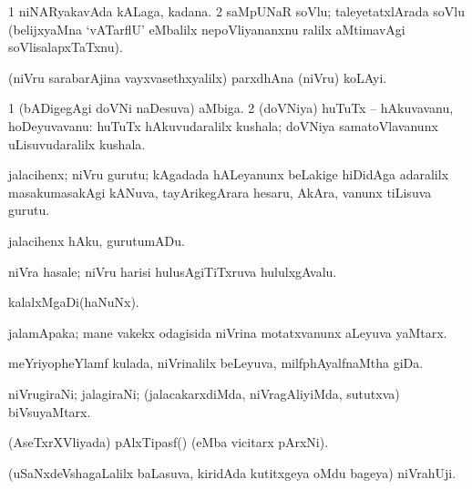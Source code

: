 \bentry
{} 
\gl{\nA}
\expl{}
\bmng
\bnum
\num{1} niNARyakavAda kALaga, kadana. 
\num{2} saMpUNaR soVlu; taleyetatxlArada soVlu (belijxyaMna `vATarflU' eMbalilx nepoVliyananxnu ralilx aMtimavAgi soVlisalapxTaTxnu). 
\enum
\emng
\eentry

\bentry
{} 
\gl{\nA}
\expl{}
\bmng
(niVru sarabarAjina vayxvasethxyalilx) parxdhAna (niVru) koLAyi. 
\emng
\eentry

\bentry
{} 
\gl{\nA}
\bmng
\bnum
\num{1} (bADigegAgi doVNi naDesuva) aMbiga. 
\num{2} (doVNiya) huTuTx -- hAkuvavanu, hoDeyuvavanu:  huTuTx hAkuvudaralilx kushala; doVNiya samatoVlavanunx uLisuvudaralilx kushala. 
\enum
\emng
\eentry

\bentry
{} 
\gl{\nA}
\expl{}
\bmng
jalacihenx; niVru gurutu; kAgadada hALeyanunx beLakige hiDidAga adaralilx masakumasakAgi kANuva, tayArikegArara hesaru, AkAra, \mo vanunx tiLisuva gurutu. 
\emng
\eentry

\bentry
{} 
\gl{\sakirx}
\expl{}
\bmng
jalacihenx hAku, gurutumADu. 
\emng
\eentry

\bentry
{} 
\gl{\nA}
\expl{}
\bmng
niVra hasale; niVru harisi hulusAgiTiTxruva hululxgAvalu. 
\emng
\eentry

\bentry
{} 
\gl{\nA}
\expl{}
\bmng
kalalxMgaDi(haNuNx). 
\emng
\eentry

\bentry
{} 
\gl{\nA}
\expl{}
\bmng
jalamApaka; mane \mo vakekx odagisida niVrina motatxvanunx aLeyuva yaMtarx. 
\emng
\eentry

\bentry
{} 
\gl{\nA}
\expl{}
\bmng
meYriyopheYlamf kulada, niVrinalilx beLeyuva, milfphAyalfnaMtha giDa. 
\emng
\eentry

\bentry
{} 
\gl{\nA}
\expl{}
\bmng
niVrugiraNi; jalagiraNi; (jalacakarxdiMda, niVragAliyiMda, sututxva) biVsuyaMtarx. 
\emng
\eentry

\bentry
{} 
\gl{\nA}
\expl{}
\bmng
(AseTxrXVliyada) pAlxTipasf() (eMba vicitarx pArxNi). 
\emng
\eentry

\bentry
{} 
\gl{\nA}
\expl{}
\bmng
(uSaNxdeVshagaLalilx baLasuva, kiridAda kutitxgeya oMdu bageya) niVrahUji. 
\emng
\eentry


